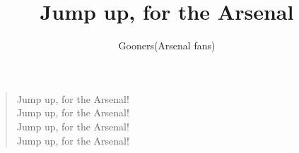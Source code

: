 \documentclass[a4paper,12pt]{article}
\title{Jump up, for the Arsenal}
\author{Gooners(Arsenal fans)}
\date{}
\begin{document}
	
	\maketitle
	
	\begin{verse}
		
		Jump up, for the Arsenal! \\
		Jump up, for the Arsenal! \\
		Jump up, for the Arsenal! \\
		Jump up, for the Arsenal!
		
	\end{verse}
	
\end{document}
